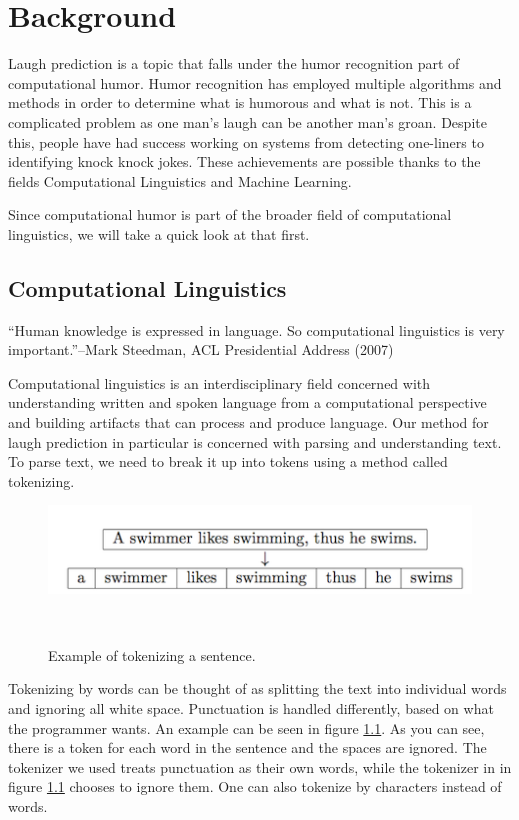 \chapter{Background}

Laugh prediction is a topic that falls under the humor recognition part of computational humor. Humor recognition has employed multiple algorithms and methods in order to determine what is humorous and what is not. This is a complicated problem as one man's laugh can be another man's groan. Despite this, people have had success working on systems from detecting one-liners to identifying knock knock jokes. These achievements are possible thanks to the fields Computational Linguistics and Machine Learning. 

Since computational humor is part of the broader field of computational linguistics, we will take a quick look at that first.


\section{Computational Linguistics}
``Human knowledge is expressed in language. So computational linguistics is very important.''–Mark Steedman, ACL Presidential Address (2007) \cite{comp_ling}

Computational linguistics is an interdisciplinary field concerned with understanding written and spoken language from a computational perspective and building artifacts that can process and produce language. \cite{comp_ling} Our method for laugh prediction in particular is concerned with parsing and understanding text. To parse text, we need to break it up into tokens using a method called tokenizing.

\begin{figure}
\centering
\includegraphics{figures/tokenizing}
  \caption{Example of tokenizing a sentence. \cite{ngrams}}~\label{fig:tokenizing}
\end{figure}

Tokenizing by words can be thought of as splitting the text into individual words and ignoring all white space. Punctuation is handled differently, based on what the programmer wants. An example can be seen in figure \ref{fig:tokenizing}. As you can see, there is a token for each word in the sentence and the spaces are ignored. The tokenizer we used treats punctuation as their own words, while the tokenizer in in figure \ref{fig:tokenizing} chooses to ignore them. One can also tokenize by characters instead of words.

